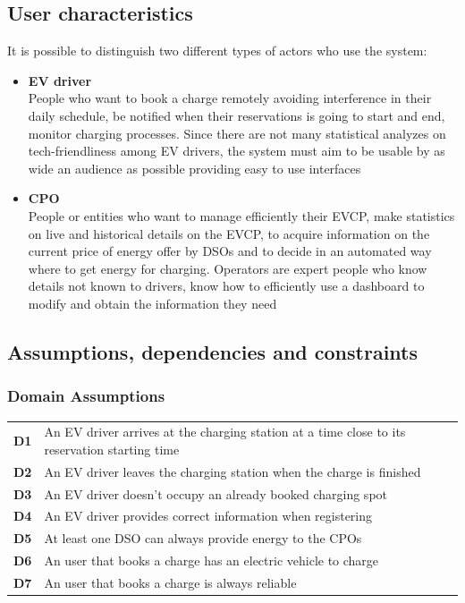 \subsection{User characteristics}
It is possible to distinguish two different types of actors who use the system:
\begin{itemize}
      \item \textbf{EV driver}\\ People who want to book a charge remotely
            avoiding interference in their daily schedule, be notified when their reservations
            is going to start and end, monitor charging processes. Since there are not many statistical analyzes on tech-friendliness among EV drivers, the system must aim to be usable by as wide an audience as possible providing easy to use interfaces
      \item \textbf{CPO}\\ People or entities who want to manage efficiently their EVCP, make statistics on live and historical details on the EVCP,
            to acquire information on the current price of energy offer by DSOs and to decide in an automated way
            where to get energy for charging. Operators are expert people who know details not known to drivers, know how to efficiently use a dashboard to modify and obtain the information they need
\end{itemize}


\subsection{Assumptions, dependencies and constraints}
\subsubsection{Domain Assumptions}
\begin{table}[H]
      \begin{tabularx}{\textwidth}{cX}
            \toprule
            \textbf{D1} & An EV driver arrives at the charging station at a time close to its reservation starting time \\
            \textbf{D2} & An EV driver leaves the charging station when the charge is finished                          \\
            \textbf{D3} & An EV driver doesn't occupy an already booked charging spot                                   \\
            \textbf{D4} & An EV driver provides correct information when registering                                    \\
            \textbf{D5} & At least one DSO can always provide energy to the CPOs                                        \\
            \textbf{D6} & An user that books a charge has an electric vehicle to charge                                 \\
            \textbf{D7} & An user that books a charge is always reliable                                                \\
            \bottomrule
      \end{tabularx}
\end{table}
